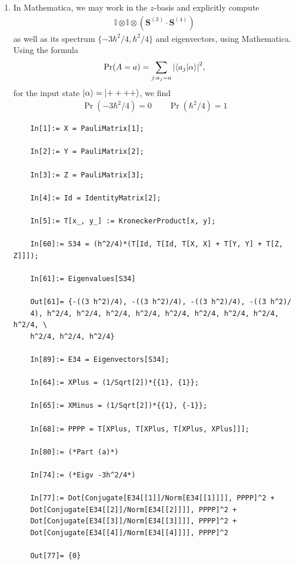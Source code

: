 \documentclass{article}
\theoremstyle{definition}
\newcommand{\al}{\alpha}
\begin{document}
\begin{enumerate}[label=(\alph*)]
	\item In Mathematica, we may work in the $z$-basis and explicitly compute 
	\begin{align*}
	\mathbb{I}\otimes \mathbb{I} \otimes (\mathbf{S}^{(3)}\cdot \mathbf{S}^{(4)})
	\end{align*}
	as well as its spectrum $\{ -3\hbar^2/4, \hbar^2/4 \}$ and eigenvectors, using Mathematica. Using the formula 
	\begin{align*}
	\Pr(A=a) = \sum_{j:a_j=a} \abs{\bra{a_j} \ket{\al}}^2,
	\end{align*}
	for the input state $\ket{\al} = \ket{++++}$, we find 
	\begin{align*}
	\boxed{\Pr(-3\hbar^2/4) = 0} \quad\quad \boxed{\Pr(\hbar^2/4) = 1}
	\end{align*}
	
	
	
	
	
	
	\begin{lstlisting}
	In[1]:= X = PauliMatrix[1];
	
	In[2]:= Y = PauliMatrix[2];
	
	In[3]:= Z = PauliMatrix[3];
	
	In[4]:= Id = IdentityMatrix[2];
	
	In[5]:= T[x_, y_] := KroneckerProduct[x, y];
	
	In[60]:= S34 = (h^2/4)*(T[Id, T[Id, T[X, X] + T[Y, Y] + T[Z, Z]]]);
	
	In[61]:= Eigenvalues[S34]
	
	Out[61]= {-((3 h^2)/4), -((3 h^2)/4), -((3 h^2)/4), -((3 h^2)/
	4), h^2/4, h^2/4, h^2/4, h^2/4, h^2/4, h^2/4, h^2/4, h^2/4, h^2/4, \
	h^2/4, h^2/4, h^2/4}
	
	In[89]:= E34 = Eigenvectors[S34];
	
	In[64]:= XPlus = (1/Sqrt[2])*{{1}, {1}};
	
	In[65]:= XMinus = (1/Sqrt[2])*{{1}, {-1}};
	
	In[68]:= PPPP = T[XPlus, T[XPlus, T[XPlus, XPlus]]];
	
	In[80]:= (*Part (a)*)
	
	In[74]:= (*Eigv -3h^2/4*)
	
	In[77]:= Dot[Conjugate[E34[[1]]/Norm[E34[[1]]]], PPPP]^2 + 
	Dot[Conjugate[E34[[2]]/Norm[E34[[2]]]], PPPP]^2 +
	Dot[Conjugate[E34[[3]]/Norm[E34[[3]]]], PPPP]^2 +
	Dot[Conjugate[E34[[4]]/Norm[E34[[4]]]], PPPP]^2
	
	Out[77]= {0}
	

\end{lstlisting}
\end{enumerate}
\end{document}
